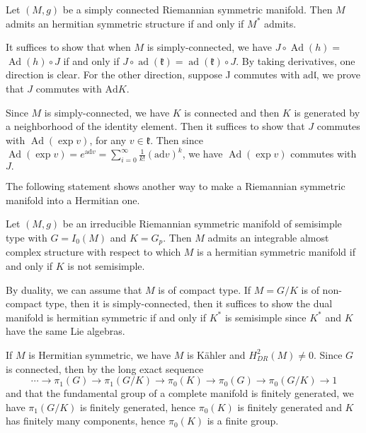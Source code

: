 \begin{corollary}
Let $(M, g)$ be a simply connected Riemannian symmetric manifold.
Then $M$ admits an hermitian symmetric structure if and only if
$M^{*}$ admits.	
\end{corollary}
\bproof
It suffices to show that when $M$ is simply-connected, we have $J
\circ \operatorname{Ad}(h)=$ $\operatorname{Ad}(h) \circ J$ if
and only if $J \circ
\operatorname{ad}(\mathfrak{k})=\operatorname{ad}(\mathfrak{k})
\circ J .$ By taking derivatives,
one direction is clear. For the other direction, suppose J
commutes with
$\mathrm{ad} \mathfrak{l}$, we prove that $J$ commutes with
$\mathrm{Ad} K$.


Since $M$ is simply-connected, we have $K$ is connected and then
$K$ is generated by a neighborhood of the identity element. Then
it suffices to show that $J$ commutes with
$\operatorname{Ad}(\exp v)$, for any $v \in \mathfrak{k}$. Then
since $\operatorname{Ad}(\exp v)=e^{\mathrm{ad} v}=\sum_{i=0}^{\infty} \frac{1}{k !}(\mathrm{ad}
v)^{k}$, we have $\operatorname{Ad}(\exp v)$ commutes with $J .$
\eproof

The following statement shows another way to make a Riemannian
symmetric manifold into a Hermitian one.
\begin{theorem}\label{13}
	Let $(M, g)$ be an irreducible Riemannian symmetric manifold of semisimple type with $G=I_{0}(M)$ and $K=G_{p}$. Then $M$ admits an integrable almost complex structure with respect to which $M$ is a hermitian symmetric manifold
	if and only if $K$ is not semisimple.
\end{theorem}
\bproof

By duality, we can assume that $M$ is of compact type.  If $M=G /
K$ is of non-compact type, then it is simply-connected, then it
suffices to show
the dual manifold is hermitian symmetric if and only if $K^{*}$
is semisimple since $K^{*}$ and $K$ have the same Lie algebras.

If $M$ is Hermitian symmetric, we have $M$ is Kähler and $H_{D
R}^{2}(M) \neq 0$. Since $G$ is connected, then by the long exact
sequence
\[
\cdots \rightarrow \pi_{1}(G) \longrightarrow \pi_{1}(G / K)
\longrightarrow \pi_{0}(K) \longrightarrow \pi_{0}(G)
\longrightarrow \pi_{0}(G / K) \rightarrow 1
\]
and that the fundamental group of a complete manifold is finitely
generated, we have $\pi_{1}(G / K)$ is finitely generated, hence
$\pi_{0}(K)$ is finitely generated and $K$ has finitely many
components, hence $\pi_{0}(K)$ is a finite group.

